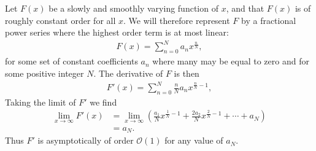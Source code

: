 \chapter{} \label{appendix:asymptotic_deriv}

Let $F(x)$ be a slowly and smoothly varying function of $x$, and that $F(x)$ is of roughly constant order for all $x$. 
We will therefore represent $F$ by a fractional power series where the highest order term is at most linear:
\begin{align}
    F(x) = \sum_{n=0}^N a_n x^{\frac{n}{N}}, \label{eq:powerseries}
\end{align}
for some set of constant coefficients ${a_n}$ where many may be equal to zero and for some positive integer $N$. 
The derivative of $F$ is then
\begin{align}
    F'(x) = \sum_{n=0}^N \frac{n}{N} a_n x^{\frac{n}{N}-1},
\end{align}
Taking the limit of $F'$ we find
\begin{align}
    \lim_{x\rightarrow \infty} F'(x) &= \lim_{x\rightarrow \infty} \left( \frac{a_1}{N} x^{\frac{1}{N}-1} + \frac{2a_2}{N} x^{\frac{2}{N}-1} + \cdots + a_N \right) \\
    &= a_N.
\end{align}
Thus $F'$ is asymptotically of order $\mathcal{O}(1)$ for any value of $a_N$.